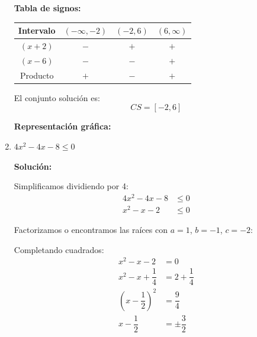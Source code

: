 \documentclass[12pt]{article}
\newcommand{\solucion}{%
    \vspace{0.8em}%
    \textbf{Solución:}%
}
\begin{document}
\begin{enumerate}[label=\alph*.-]
    \textbf{Tabla de signos:}

    \begin{center}
    \begin{tabular}{|c|c|c|c|}
    \hline
    Intervalo & $(-\infty, -2)$ & $(-2, 6)$ & $(6, \infty)$ \\
    \hline
    $(x+2)$ & $-$ & $+$ & $+$ \\
    \hline
    $(x-6)$ & $-$ & $-$ & $+$ \\
    \hline
    Producto & $+$ & $-$ & $+$ \\
    \hline
    \end{tabular}
    \end{center}

    El conjunto solución es:
    \[
    \boxed{CS = [-2, 6]}
    \]

    \textbf{Representación gráfica:}

    \begin{center}
    \end{center}

    \newpage
    \item $4x^2 - 4x - 8 \leq 0$

    \solucion

    Simplificamos dividiendo por 4:
    \begin{align*}
    4x^2 - 4x - 8 &\leq 0 \\[0.3em]
    x^2 - x - 2 &\leq 0
    \end{align*}

    Factorizamos o encontramos las raíces con $a = 1$, $b = -1$, $c = -2$:
    
    Completando cuadrados:
    \begin{align*}
    x^2 - x - 2 &= 0 \\[0.3em]
    x^2 - x + \dfrac{1}{4} &= 2 + \dfrac{1}{4} \\[0.3em]
    \left(x - \dfrac{1}{2}\right)^2 &= \dfrac{9}{4} \\[0.3em]
    x - \dfrac{1}{2} &= \pm \dfrac{3}{2}
    \end{align*}


\end{enumerate}
\end{document}
